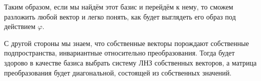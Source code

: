 \documentclass[a4paper, 12pt]{article}
\begin{document}
\begin{spacing}{1.5}
Таким образом, если мы найдём этот базис и перейдём к нему, то сможем разложить любой вектор и легко понять, как будет выглядеть его образ под действием $\varphi$.

С другой стороны мы знаем, что собственные векторы порождают собственные подпространства, инвариантные относительно преобразования. Тогда будет здорово в качестве базиса выбрать систему ЛНЗ собственных векторов, а матрица преобразования будет диагональной, состоящей из собственных значений.

\end{spacing}
\end{document}
